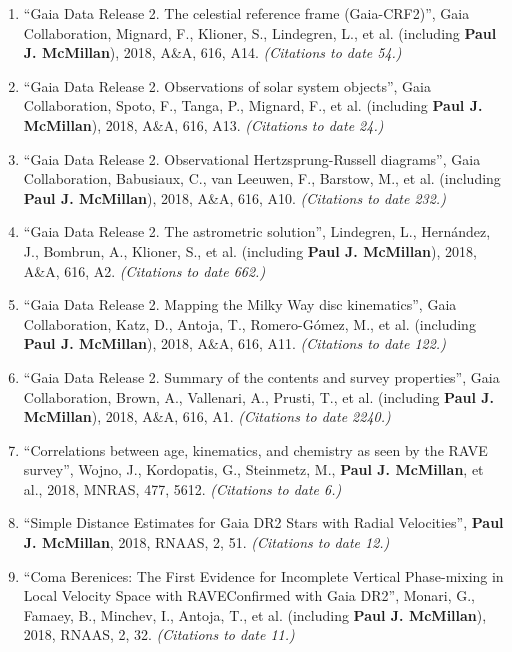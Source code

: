 \documentclass{resume}
\begin{document}
\begin{enumerate}
\item ``Gaia Data Release 2. The celestial reference frame (Gaia-CRF2)'', Gaia Collaboration, Mignard, F., Klioner, S., Lindegren, L., et al. (including \textbf{Paul J. McMillan}), 2018, A\&A, 616, A14. \textit{(Citations to date 54.)}

\item ``Gaia Data Release 2. Observations of solar system objects'', Gaia Collaboration, Spoto, F., Tanga, P., Mignard, F., et al. (including \textbf{Paul J. McMillan}), 2018, A\&A, 616, A13. \textit{(Citations to date 24.)}

\item ``Gaia Data Release 2. Observational Hertzsprung-Russell diagrams'', Gaia Collaboration, Babusiaux, C., van Leeuwen, F., Barstow, M., et al. (including \textbf{Paul J. McMillan}), 2018, A\&A, 616, A10. \textit{(Citations to date 232.)}

\item ``Gaia Data Release 2. The astrometric solution'', Lindegren, L., Hern\'andez, J., Bombrun, A., Klioner, S., et al. (including \textbf{Paul J. McMillan}), 2018, A\&A, 616, A2. \textit{(Citations to date 662.)}

\item ``Gaia Data Release 2. Mapping the Milky Way disc kinematics'', Gaia Collaboration, Katz, D., Antoja, T., Romero-G\'omez, M., et al. (including \textbf{Paul J. McMillan}), 2018, A\&A, 616, A11. \textit{(Citations to date 122.)}

\item ``Gaia Data Release 2. Summary of the contents and survey properties'', Gaia Collaboration, Brown, A., Vallenari, A., Prusti, T., et al. (including \textbf{Paul J. McMillan}), 2018, A\&A, 616, A1. \textit{(Citations to date 2240.)}

\item ``Correlations between age, kinematics, and chemistry as seen by the RAVE survey'', Wojno, J., Kordopatis, G., Steinmetz, M., \textbf{Paul J. McMillan}, et al., 2018, MNRAS, 477, 5612. \textit{(Citations to date 6.)}

\item ``Simple Distance Estimates for Gaia DR2 Stars with Radial Velocities'', \textbf{Paul J. McMillan}, 2018, RNAAS, 2, 51. \textit{(Citations to date 12.)}

\item ``Coma Berenices: The First Evidence for Incomplete Vertical Phase-mixing in Local Velocity Space with RAVE{\textemdash}Confirmed with Gaia DR2'', Monari, G., Famaey, B., Minchev, I., Antoja, T., et al. (including \textbf{Paul J. McMillan}), 2018, RNAAS, 2, 32. \textit{(Citations to date 11.)}


\end{enumerate}
\end{document}
